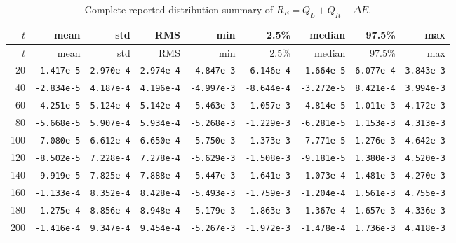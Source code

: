 \documentclass[11pt]{article}
\begin{document}
\begingroup
\scriptsize
\setlength{\tabcolsep}{3pt}
\begin{longtable}{rrrrrrrrr}
\caption{Complete reported distribution summary of
$R_E=Q_L+Q_R-\Delta E$.}\label{tab:balance}\\
\toprule
$t$ & mean & std & RMS & min & 2.5\% & median & 97.5\% & max \\
\midrule
\endfirsthead
\toprule
$t$ & mean & std & RMS & min & 2.5\% & median & 97.5\% & max \\
\midrule
\endhead
20  & \texttt{-1.417e-5} & \texttt{2.970e-4} & \texttt{2.974e-4} & \texttt{-4.847e-3} & \texttt{-6.146e-4} & \texttt{-1.664e-5} & \texttt{6.077e-4} & \texttt{3.843e-3} \\
40  & \texttt{-2.834e-5} & \texttt{4.187e-4} & \texttt{4.196e-4} & \texttt{-4.997e-3} & \texttt{-8.644e-4} & \texttt{-3.272e-5} & \texttt{8.421e-4} & \texttt{3.994e-3} \\
60  & \texttt{-4.251e-5} & \texttt{5.124e-4} & \texttt{5.142e-4} & \texttt{-5.463e-3} & \texttt{-1.057e-3} & \texttt{-4.814e-5} & \texttt{1.011e-3} & \texttt{4.172e-3} \\
80  & \texttt{-5.668e-5} & \texttt{5.907e-4} & \texttt{5.934e-4} & \texttt{-5.268e-3} & \texttt{-1.229e-3} & \texttt{-6.281e-5} & \texttt{1.153e-3} & \texttt{4.313e-3} \\
100 & \texttt{-7.080e-5} & \texttt{6.612e-4} & \texttt{6.650e-4} & \texttt{-5.750e-3} & \texttt{-1.373e-3} & \texttt{-7.771e-5} & \texttt{1.276e-3} & \texttt{4.642e-3} \\
120 & \texttt{-8.502e-5} & \texttt{7.228e-4} & \texttt{7.278e-4} & \texttt{-5.629e-3} & \texttt{-1.508e-3} & \texttt{-9.181e-5} & \texttt{1.380e-3} & \texttt{4.520e-3} \\
140 & \texttt{-9.919e-5} & \texttt{7.825e-4} & \texttt{7.888e-4} & \texttt{-5.447e-3} & \texttt{-1.641e-3} & \texttt{-1.073e-4} & \texttt{1.481e-3} & \texttt{4.270e-3} \\
160 & \texttt{-1.133e-4} & \texttt{8.352e-4} & \texttt{8.428e-4} & \texttt{-5.493e-3} & \texttt{-1.759e-3} & \texttt{-1.204e-4} & \texttt{1.561e-3} & \texttt{4.755e-3} \\
180 & \texttt{-1.275e-4} & \texttt{8.856e-4} & \texttt{8.948e-4} & \texttt{-5.179e-3} & \texttt{-1.863e-3} & \texttt{-1.367e-4} & \texttt{1.657e-3} & \texttt{4.336e-3} \\
200 & \texttt{-1.416e-4} & \texttt{9.347e-4} & \texttt{9.454e-4} & \texttt{-5.267e-3} & \texttt{-1.972e-3} & \texttt{-1.478e-4} & \texttt{1.736e-3} & \texttt{4.418e-3} \\
\bottomrule
\end{longtable}
\endgroup
\end{document}
